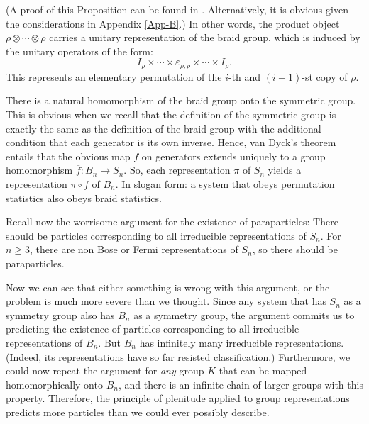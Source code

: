 \documentclass[12pt]{article}
\theoremstyle{definition}
\theoremstyle{definition}
\theoremstyle{remark}
\newcommand{\ve}{\varepsilon}
\def\ol#1{{\overline #1}}
\begin{document}
(A proof of this Proposition can be found in \cite{rehr}.
Alternatively, it is obvious given the considerations in Appendix
\ref{App-B}.)  In other words, the product object $\rho \otimes \cdots
\otimes \rho$ carries a unitary representation of the braid group,
which is induced by the unitary operators of the form:
$$I_\rho \times \cdots \times \ve _{\rho ,\rho} \times \cdots
\times I_\rho .$$ This represents an elementary permutation of the
$i$-th and $(i+1)$-st copy of $\rho$.

There is a natural homomorphism of the braid group onto the symmetric
group.  This is obvious when we recall that the definition of the
symmetric group is exactly the same as the definition of the braid
group with the additional condition that each generator is its own
inverse.  Hence, van Dyck's theorem \cite[p.\ 78]{hung} entails that
the obvious map $f$ on generators extends uniquely to a group
homomorphism $\ol f:B_n\to S_n$.  So, each representation $\pi$ of
$S_n$ yields a representation $\pi \circ \ol f$ of $B_n$. In slogan
form: a system that obeys permutation statistics also obeys braid
statistics.

Recall now the worrisome argument for the existence of paraparticles: 
There should be particles corresponding to all irreducible
representations of $S_n$.  For $n\geq 3$, there are non Bose or Fermi
representations of $S_n$, so there should be paraparticles.  

Now we can see that either something is wrong with this
argument, or the problem is much more severe than we
thought.  Since any system that has $S_n$ as a symmetry
group also has $B_n$ as a symmetry group, the argument
commits us to predicting the existence of particles
corresponding to all irreducible representations of
$B_n$.  But $B_n$ has infinitely many irreducible
representations.  (Indeed, its representations have so
far resisted classification.)  Furthermore, we could
now repeat the argument for \emph{any} group $K$ that
can be mapped homomorphically onto $B_n$, and there is
an infinite chain of larger groups with this property.
Therefore, the principle of plenitude applied to group
representations predicts more particles than we could
ever possibly describe.

\bigskip {}


 {\small  }
\end{document}
